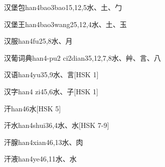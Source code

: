 \begin{EntryWithPhonetic}{汉堡包}{han4bao3bao1}{5,12,5}{⽔、⼟、⼓}
\end{EntryWithPhonetic}

\begin{EntryWithPhonetic}{汉堡王}{han4bao3wang2}{5,12,4}{⽔、⼟、⽟}
\end{EntryWithPhonetic}

\begin{EntryWithPhonetic}{汉服}{han4fu2}{5,8}{⽔、⽉}
\end{EntryWithPhonetic}

\begin{EntryWithPhonetic}{汉葡词典}{han4-pu2 ci2dian3}{5,12,7,8}{⽔、⾋、⾔、⼋}
\end{EntryWithPhonetic}

\begin{EntryWithPhonetic}{汉语}{han4yu3}{5,9}{⽔、⾔}[HSK 1]
\end{EntryWithPhonetic}

\begin{EntryWithPhonetic}{汉字}{han4 zi4}{5,6}{⽔、⼦}[HSK 1]
\end{EntryWithPhonetic}

\begin{EntryWithPhonetic}{汗}{han4}{6}{⽔}[HSK 5]
\end{EntryWithPhonetic}

\begin{EntryWithPhonetic}{汗水}{han4shui3}{6,4}{⽔、⽔}[HSK 7-9]
\end{EntryWithPhonetic}

\begin{EntryWithPhonetic}{汗腺}{han4xian4}{6,13}{⽔、⾁}
\end{EntryWithPhonetic}

\begin{EntryWithPhonetic}{汗液}{han4ye4}{6,11}{⽔、⽔}
\end{EntryWithPhonetic}

